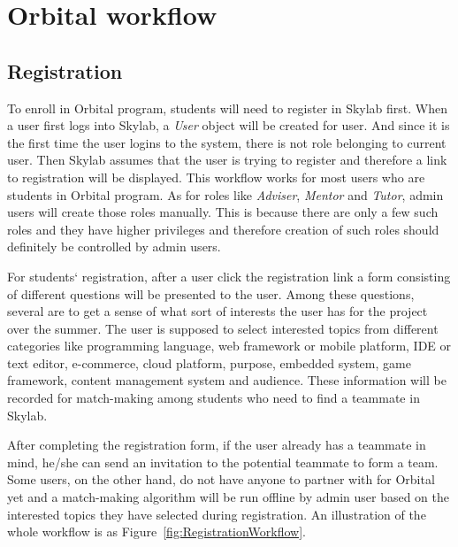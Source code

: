 \chapter{Orbital workflow} \label{workflow}

\section{Registration} \label{registration}

To enroll in Orbital program, students will need to register in Skylab first. When a user first logs into Skylab, a \textit{User} object will be created for user. And since it is the first time the user logins to the system, there is not role belonging to current user. Then Skylab assumes that the user is trying to register and therefore a link to registration will be displayed. This workflow works for most users who are students in Orbital program. As for roles like \textit{Adviser}, \textit{Mentor} and \textit{Tutor}, admin users will create those roles manually. This is because there are only a few such roles and they have higher privileges and therefore creation of such roles should definitely be controlled by admin users.

For students` registration, after a user click the registration link a form consisting of different questions will be presented to the user. Among these questions, several are to get a sense of what sort of interests the user has for the project over the summer. The user is supposed to select interested topics from different categories like programming language, web framework or mobile platform, IDE or text editor, e-commerce, cloud platform, purpose, embedded system, game framework, content management system and audience. These information will be recorded for match-making among students who need to find a teammate in Skylab.

After completing the registration form, if the user already has a teammate in mind, he/she can send an invitation to the potential teammate to form a team. Some users, on the other hand, do not have anyone to partner with for Orbital yet and a match-making algorithm will be run offline by admin user based on the interested topics they have selected during registration. An illustration of the whole workflow is as Figure~\ref{fig:RegistrationWorkflow}.

